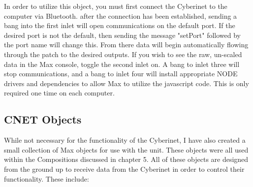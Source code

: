 In order to utilize this object, you must first connect the Cyberinet to the computer via Bluetooth. after the connection has been established, sending a bang into the first inlet will open communications on the default port. If the desired port is not the default, then sending the message "setPort" followed by the port name will change this. From there data will begin automatically flowing through the patch to the desired outputs. If you wish to see the raw, un-scaled data in the Max console, toggle the second inlet on. A bang to inlet three will stop communications, and a bang to inlet four will install appropriate NODE drivers and dependencies to allow Max to utilize the javascript code. This is only required one time on each computer.

\subsection{CNET Objects}

While not necessary for the functionality of the Cyberinet, I have also created a small collection of Max objects for use with the unit. These objects were all used within the Compositions discussed in chapter 5. All of these objects are designed from the ground up to receive data from the Cyberinet in order to control their functionality. These include:

